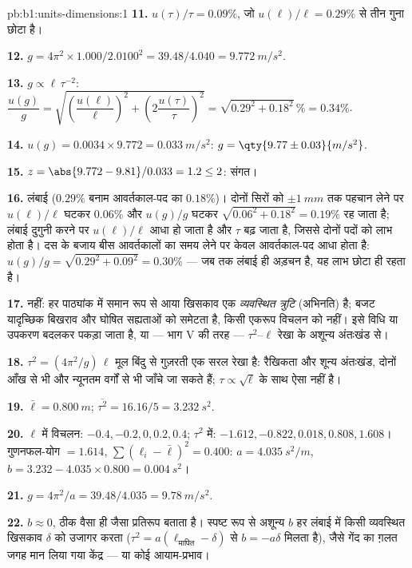 \begin{solution}{pb:b1:units-dimensions:1}
\textbf{11.} $u(\tau)/\tau = 0.09\%$, जो $u(\ell)/\ell = 0.29\%$ से तीन गुना
छोटा है।

\textbf{12.} $g = 4\pi^2 \times 1.000/2.0100^2 = 39.48/4.040 =
\qty{9.772}{m/s^2}$.

\textbf{13.} $g \propto \ell\,\tau^{-2}$:
$\dfrac{u(g)}{g} = \sqrt{\left(\dfrac{u(\ell)}{\ell}\right)^2
+ \left(2\dfrac{u(\tau)}{\tau}\right)^2} = \sqrt{0.29^2 + 0.18^2}\,\%
= 0.34\%$.

\textbf{14.} $u(g) = 0.0034 \times 9.772 = \qty{0.033}{m/s^2}$:
$g = \qty{9.77\pm0.03}{m/s^2}$.

\textbf{15.} $z = \abs{9.772 - 9.81}/0.033 = 1.2 \leq 2$: संगत।

\textbf{16.} लंबाई ($0.29\%$ बनाम आवर्तकाल-पद का $0.18\%$)। दोनों सिरों को
$\pm\qty{1}{mm}$ तक पहचान लेने पर $u(\ell)/\ell$ घटकर $0.06\%$ और $u(g)/g$
घटकर $\sqrt{0.06^2 + 0.18^2} = 0.19\%$ रह जाता है; लंबाई दुगुनी करने पर
$u(\ell)/\ell$ आधा हो जाता है और $\tau$ बढ़ जाता है, जिससे दोनों पदों को लाभ
होता है। दस के बजाय बीस आवर्तकालों का समय लेने पर केवल आवर्तकाल-पद आधा होता
है: $u(g)/g = \sqrt{0.29^2 + 0.09^2} = 0.30\%$ --- जब तक लंबाई ही अड़चन है,
यह लाभ छोटा ही रहता है।

\textbf{17.} नहीं: हर पाठ्यांक में समान रूप से आया खिसकाव एक
\emph{व्यवस्थित त्रुटि} (अभिनति) है; बजट यादृच्छिक बिखराव और घोषित सह्यताओं
को समेटता है, किसी एकरूप विचलन को नहीं। इसे विधि या उपकरण बदलकर पकड़ा जाता
है, या --- भाग V की तरह --- $\tau^2$--$\ell$ रेखा के अशून्य अंतःखंड से।

\textbf{18.} $\tau^2 = (4\pi^2/g)\,\ell$ मूल बिंदु से गुज़रती एक सरल रेखा है:
रैखिकता और शून्य अंतःखंड, दोनों आँख से भी और न्यूनतम वर्गों से भी जाँचे जा
सकते हैं; $\tau \propto \sqrt\ell$ के साथ ऐसा नहीं है।

\textbf{19.} $\bar\ell = \qty{0.800}{m}$; $\overline{\tau^2} = 16.16/5 =
\qty{3.232}{s^2}$.

\textbf{20.} $\ell$ में विचलन: $-0.4, -0.2, 0, 0.2, 0.4$;
$\tau^2$ में: $-1.612, -0.822, 0.018, 0.808, 1.608$। गुणनफल-योग $= 1.614$,
$\sum(\ell_i - \bar\ell)^2 = 0.400$: $a = \qty{4.035}{s^2/m}$,
$b = 3.232 - 4.035 \times 0.800 = \qty{0.004}{s^2}$।

\textbf{21.} $g = 4\pi^2/a = 39.48/4.035 = \qty{9.78}{m/s^2}$.

\textbf{22.} $b \approx 0$, ठीक वैसा ही जैसा प्रतिरूप बताता है। स्पष्ट रूप से
अशून्य $b$ हर लंबाई में किसी व्यवस्थित खिसकाव $\delta$ को उजागर करता
($\tau^2 = a(\ell_{\text{मापित}} - \delta)$ से $b = -a\delta$ मिलता है), जैसे
गेंद का ग़लत जगह मान लिया गया केंद्र --- या कोई आयाम-प्रभाव।


\end{solution}
